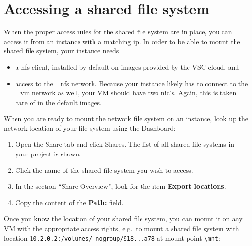 \section*{Accessing a shared file system}\label{sec:access-shar-file}
When the proper access rules for the shared file system are in place,
you can access it from an instance with a matching ip.  In order to be
able to mount the shared file system, your instance needs
\begin{itemize}
\item a \gls{nfs} client, installed by default on images provided by
  the VSC cloud, and
\item access to the \_nfs network.  Because your instance likely has to
  connect to the \_vm network as well, your VM should have two
  \gls{nic}'s.  Again, this is taken care of in the default images.
\end{itemize}

When you are ready to mount the network file system on an instance,
look up the network location of your file system using the Dashboard:
\begin{enumerate}
\item Open the Share tab and click Shares.  The list of all shared file systems in your project is shown.
\item Click the name of the shared file system you wish to access.
\item In the section ``Share Overview'', look for the item \textbf{Export locations}.
\item Copy the content of the \textbf{Path:} field.
\end{enumerate}

Once you know the location of your shared file system, you can mount
it on any VM with the appropriate access rights, e.g.\ to mount a
shared file system with location
\lstinline{10.2.0.2:/volumes/_nogroup/918...a78} at mount point
\lstinline{\mnt}:

\begin{prompt}
\end{prompt}
